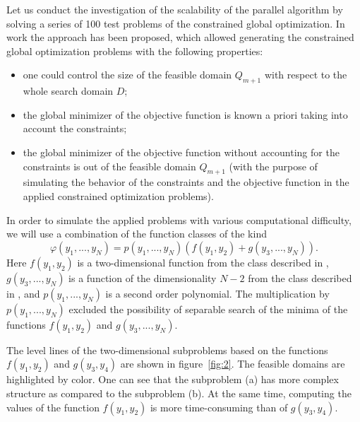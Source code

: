 \documentclass[a4paper]{jpconf}
\begin{document}
Let us conduct the investigation of the scalability of the parallel 
algorithm by solving a series of 100 test problems of the constrained global 
optimization. In work \cite{Gergel2017} the approach has been proposed, which allowed 
generating the constrained global optimization problems with the following 
properties:
\begin{itemize}
	\item one could control the size of the feasible domain $Q_{m+1}$ with 
respect to the whole search domain $D$;
	\item the global minimizer of the objective function is known a priori 
taking into account the constraints;
	\item the global minimizer of the objective function without accounting 
for the constraints is out of the feasible domain $Q_{m+1}$  (with the 
purpose of simulating the behavior of the constraints and the objective 
function in the applied constrained optimization problems).
\end{itemize}

In order to simulate the applied problems with various computational 
difficulty, we will use a combination of the function classes of the kind 
\[
\varphi(y_1,...,y_N) = p(y_1,...,y_N)(f(y_1,y_2)+g(y_3,...,y_N)).
\]
Here $f(y_1,y_2)$ is a two-dimensional function from the class described in \cite{Gergel2016}, $g(y_3,...,y_N)$ is a function of the dimensionality $N-2$ from the 
class described in \cite{Sergeyev2015}, and $p(y_1,...,y_N)$ is a second 
order polynomial. The multiplication by $p(y_1,...,y_N)$ excluded the possibility of 
separable search of the minima of the functions $f(y_1,y_2)$ and 
$g(y_3,...,y_N)$. 

The level lines of the two-dimensional subproblems based on the functions 
$f(y_1,y_2)$ and $g(y_3,y_4)$ are shown in figure~\ref{fig:2}. The feasible domains are highlighted by color. One can see that 
the subproblem (a) has more complex structure as compared to the subproblem 
(b). At the same time, computing the values of the function $f(y_1,y_2)$ is 
more time-consuming than of $g(y_3,y_4)$.
\end{document}
